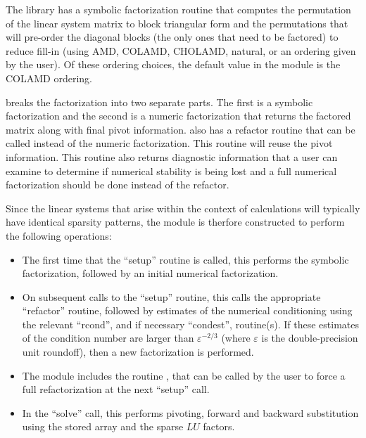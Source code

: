 The {\klu} library has a symbolic factorization routine that computes
the permutation of the linear system matrix to block triangular form
and the permutations that will pre-order the diagonal blocks (the only
ones that need to be factored) to reduce fill-in (using AMD, COLAMD,
CHOLAMD, natural, or an ordering given by the user).  Of these
ordering choices, the default value in the {\sunlinsolklu} 
module is the COLAMD ordering.

{\klu} breaks the factorization into two separate parts.  The first is
a symbolic factorization and the second is a numeric factorization
that returns the factored matrix along with final pivot information.   
{\klu} also has a refactor routine that can be called instead of the numeric 
factorization.  This routine will reuse the pivot information.  This routine 
also returns diagnostic information that a user can examine to determine if 
numerical stability is being lost and a full numerical factorization should 
be done instead of the refactor.

Since the linear systems that arise within the context of {\sundials}
calculations will typically have identical sparsity patterns, the
{\sunlinsolklu} module is therfore constructed to perform the
following operations:
\begin{itemize}
\item The first time that the ``setup'' routine is called, this
  performs the symbolic factorization, followed by an initial
  numerical factorization.  
\item On subsequent calls to the ``setup'' routine, this calls the
  appropriate {\klu} ``refactor'' routine, followed by estimates of
  the numerical conditioning using the relevant ``rcond'', and if
  necessary ``condest'', routine(s).  If these estimates of the
  condition number are larger than $\varepsilon^{-2/3}$ (where
  $\varepsilon$ is the double-precision unit roundoff), then a new
  factorization is performed.
\item The module includes the routine , that 
  can be called by the user to force a full refactorization at the
  next ``setup'' call. 
\item In the ``solve'' call, this performs pivoting, forward and
  backward substitution using the stored  array and the
  sparse $LU$ factors.
\end{itemize}


